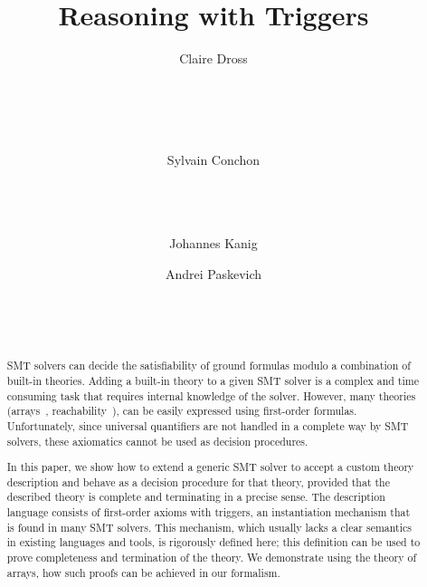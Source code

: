 \documentclass[]{easychair}
\title{Reasoning with Triggers}
\author{
Claire Dross\\
\affiliation{LRI, Universit\'e Paris-Sud 11,}\\
\affiliation{CNRS, Orsay F-91405}\\
\affiliation{INRIA Saclay-\^Ile de France,}\\
\affiliation{ProVal, Orsay F-91893}\\
\affiliation{AdaCore, Paris F-75009}
\and
Sylvain Conchon\\
\affiliation{LRI, Universit\'e Paris-Sud 11,}\\
\affiliation{CNRS, Orsay F-91405}\\
\affiliation{INRIA Saclay-\^Ile de France,}\\
\affiliation{ProVal, Orsay F-91893}\and
Johannes Kanig\\
\affiliation{AdaCore, Paris F-75009} \and
Andrei Paskevich\\
\affiliation{LRI, Universit\'e Paris-Sud 11,}\\
\affiliation{CNRS, Orsay F-91405}\\
\affiliation{INRIA Saclay-\^Ile de France,}\\
\affiliation{ProVal, Orsay F-91893}}
\newcommand{\ie}{{\em i.e.},\xspace}
\begin{document}
\maketitle

\begin{abstract}
SMT solvers can decide the satisfiability of ground formulas
modulo a combination of built-in theories. Adding a built-in theory to a given
SMT solver is a complex and time consuming task that requires internal
knowledge of the solver. However, many theories (arrays~\cite{nelson-arrays},
reachability~\cite{lahiri2008back}), can be easily expressed using
first-order formulas. Unfortunately,
since universal quantifiers are not handled in a complete way by SMT solvers,
these axiomatics cannot be used as decision procedures.

In this paper, we show how to extend a generic SMT solver to accept a
custom theory description and behave as a decision procedure for that
theory, provided that the described theory is complete and terminating
in a precise sense. The description language consists of first-order
axioms with triggers, an instantiation mechanism that is found in many
SMT solvers. This mechanism, which usually lacks a clear semantics in
existing languages and tools, is rigorously defined here; this
definition can be used to prove completeness and termination of the
theory. We demonstrate using the theory of arrays, how such proofs can
be achieved in our formalism.
\end{abstract}

% 
\end{document}

